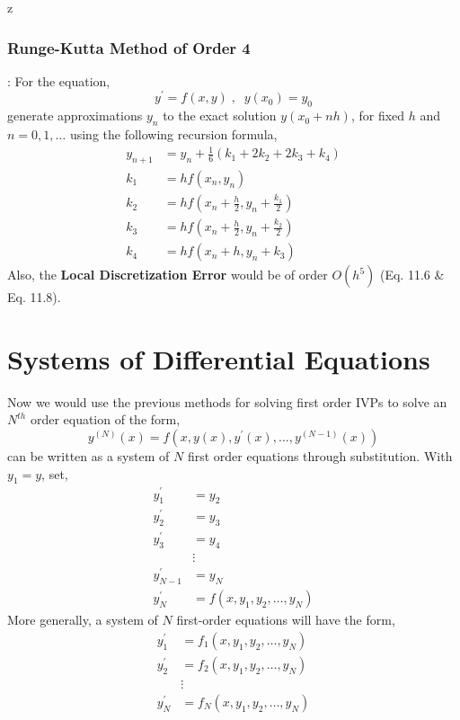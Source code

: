 z\documentclass[a4paper,12pt,twoside]{book}
\newcommand{\algo}[0]{\boxed{\textbf{\textit{Algorithm}}}}
\renewcommand{\d}[0]{\prime}
\begin{document}
\subsubsection{Runge-Kutta Method of Order 4}
\algo : For the equation, 
\[y^\d = f(x,y) \;,\;\; y(x_0) = y_0\]
generate approximations $y_n$ to the exact solution $y(x_0 + nh)$, for fixed $h$ and $n=0,1,\dots$ using the following recursion formula,
\begin{equation}
    \begin{split}
        y_{n+1} &= y_n + \frac{1}{6}(k_1 + 2k_2 + 2k_3 + k_4)\\
        k_1 &= hf(x_n,y_n)\\
        k_2 &= hf(x_n + \frac{h}{2}, y_n + \frac{k_1}{2})\\
        k_3 &= hf(x_n + \frac{h}{2}, y_n + \frac{k_2}{2})\\
        k_4 &= hf(x_n + h, y_n + k_3)
    \end{split}
\end{equation}
Also, the \textbf{Local Discretization Error} would be of order $O(h^5)$ (Eq. 11.6 \& Eq. 11.8).
\section{Systems of Differential Equations}
Now we would use the previous methods for solving first order IVPs to solve an $N^{th}$ order equation of the form,
\begin{equation}
    y^{(N)}(x) = f(x,y(x),y^\d(x),\dots,y^{(N-1)}(x))
\end{equation}
can be written as a system of $N$ first order equations through substitution. With $y_1 = y$, set,
\begin{equation}
\begin{split}
    y_1^\d &= y_2\\
    y_2^\d &= y_3\\
    y_3^\d &= y_4\\
    &\vdots\\
    y_{N-1}^\d &= y_N\\
    y_N^\d &= f(x,y_1,y_2,\dots,y_N)
\end{split}
\end{equation}
More generally, a system of $N$ first-order equations will have the form,
\begin{equation}
    \begin{split}
        y_1^\d &= f_1(x,y_1,y_2,\dots,y_N)\\
        y_2^\d &= f_2(x,y_1,y_2,\dots,y_N)\\
        &\vdots\\
        y_N^\d &= f_N(x,y_1,y_2,\dots,y_N)
    \end{split}
\end{equation}
\end{document}
